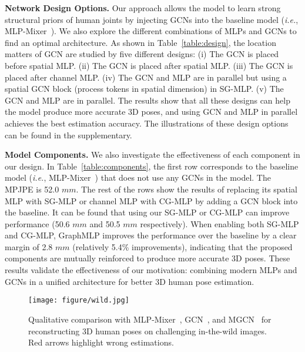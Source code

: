 \documentclass[lettersize,journal]{IEEEtran}
\begin{document}
\noindent \textbf{Network Design Options.}
Our approach allows the model to learn strong structural priors of human joints by injecting GCNs into the baseline model (\emph{i.e.}, MLP-Mixer~\cite{mlpmixer}). 
We also explore the different combinations of MLPs and GCNs to find an optimal architecture. 
As shown in Table~\ref{table:design}, the location matters of GCN are studied by five different designs: 
(i) The GCN is placed before spatial MLP. 
(ii) The GCN is placed after spatial MLP. 
(iii) The GCN is placed after channel MLP. 
(iv) The GCN and MLP are in parallel but using a spatial GCN block (process tokens in spatial dimension) in SG-MLP. 
(v) The GCN and MLP are in parallel. 
The results show that all these designs can help the model produce more accurate 3D poses, and using GCN and MLP in parallel achieves the best estimation accuracy. 
The illustrations of these design options can be found in the supplementary. 

\noindent \textbf{Model Components.}
We also investigate the effectiveness of each component in our design. 
In Table~\ref{table:components}, the first row corresponds to the baseline model (\emph{i.e.}, MLP-Mixer~\cite{mlpmixer}) that does not use any GCNs in the model. 
The MPJPE is 52.0 $mm$. 
The rest of the rows show the results of replacing its spatial MLP with SG-MLP or channel MLP with CG-MLP by adding a GCN block into the baseline. 
It can be found that using our SG-MLP or CG-MLP can improve performance (50.6 $mm$ and 50.5 $mm$ respectively). 
When enabling both SG-MLP and CG-MLP, GraphMLP improves the performance over the baseline by a clear margin of 2.8 $mm$ (relatively 5.4\% improvements), indicating that the proposed components are mutually reinforced to produce more accurate 3D poses. 
These results validate the effectiveness of our motivation: combining modern MLPs and GCNs in a unified architecture for better 3D human pose estimation. 

\begin{figure}[t]
\centering
\texttt{[image: figure/wild.jpg]}
\caption
{
  Qualitative comparison with MLP-Mixer~\cite{mlpmixer}, GCN~\cite{stgcn}, and MGCN~\cite{zou2021modulated} for reconstructing 3D human poses on challenging in-the-wild images. 
  Red arrows highlight wrong estimations. 
}
\label{fig:wild}
\end{figure}
\end{document}
